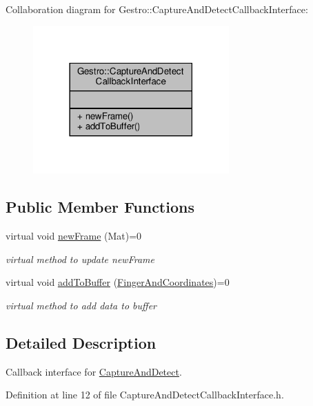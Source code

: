 Collaboration diagram for Gestro\+:\+:Capture\+And\+Detect\+Callback\+Interface\+:
\nopagebreak
\begin{figure}[H]
\begin{center}
\leavevmode
\includegraphics[width=213pt]{class_gestro_1_1_capture_and_detect_callback_interface__coll__graph}
\end{center}
\end{figure}
\subsection*{Public Member Functions}
\begin{DoxyCompactItemize}
\item 
virtual void \hyperlink{class_gestro_1_1_capture_and_detect_callback_interface_a9a42d0f1b3fd64cea607eeb4e6a46287}{new\+Frame} (Mat)=0
\begin{DoxyCompactList}\small\item\em virtual method to update new\+Frame \end{DoxyCompactList}\item 
virtual void \hyperlink{class_gestro_1_1_capture_and_detect_callback_interface_a8397891f6177ba6257e9cc978d9ddd52}{add\+To\+Buffer} (\hyperlink{class_gesture_detection_1_1_finger_and_coordinates}{Finger\+And\+Coordinates})=0
\begin{DoxyCompactList}\small\item\em virtual method to add data to buffer \end{DoxyCompactList}\end{DoxyCompactItemize}


\subsection{Detailed Description}
Callback interface for \hyperlink{class_gestro_1_1_capture_and_detect}{Capture\+And\+Detect}. 

Definition at line 12 of file Capture\+And\+Detect\+Callback\+Interface.\+h.



